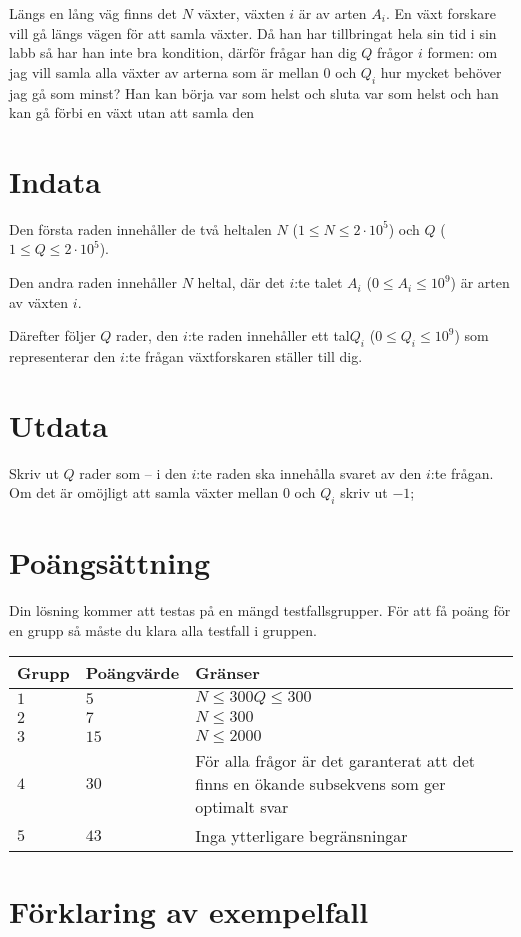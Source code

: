 Längs en lång väg finns det $N$ växter, växten $i$ är av arten $A_i$. En växt forskare vill gå längs vägen för att samla växter. Då han har tillbringat hela sin tid i sin labb så har han inte bra kondition,
därför frågar han dig $Q$ frågor $i$ formen: om jag vill samla alla växter av arterna som är mellan $0$ och $Q_i$ hur mycket behöver jag gå som minst?
Han kan börja var som helst och sluta var som helst och han kan gå förbi en växt utan att samla den
\section*{Indata}
Den första raden innehåller de två heltalen $N$ ($1\leq N \leq 2 \cdot 10^5$) och $Q$ ($1 \leq Q \leq 2 \cdot 10^5$).

Den andra raden innehåller $N$ heltal, där det $i$:te talet $A_i$ ($0\le A_i \le 10^9$) är arten av växten $i$.

Därefter följer $Q$ rader, den $i$:te raden innehåller ett tal$Q_i$ ($0 \leq Q_i \leq 10^9$) som representerar den $i$:te frågan växtforskaren ställer till dig.

\section*{Utdata}
Skriv ut $Q$ rader som -- i den $i$:te raden ska innehålla svaret av den $i$:te frågan. Om det är omöjligt att samla växter mellan $0$ och $Q_i$  skriv ut $-1$;

\section*{Poängsättning}
Din lösning kommer att testas på en mängd testfallsgrupper.
För att få poäng för en grupp så måste du klara alla testfall i gruppen.

\noindent
\begin{tabular}{| l | l | p{12cm} |}
  \hline
  Grupp & Poängvärde & Gränser \\ \hline
  $1$   & $5$       & $N \leq 300 Q \leq 300 $\\ \hline
  $2$   & $7$       & $N \leq 300 $\\ \hline
  $3$   & $15$       & $N \leq 2000 $  \\ \hline
  $4$   & $30$       &  För alla frågor är det garanterat att det finns en ökande subsekvens som ger optimalt svar \\ \hline
  $5$   & $43$       & Inga ytterligare begränsningar \\ \hline
\end{tabular}

\section*{Förklaring av exempelfall}
